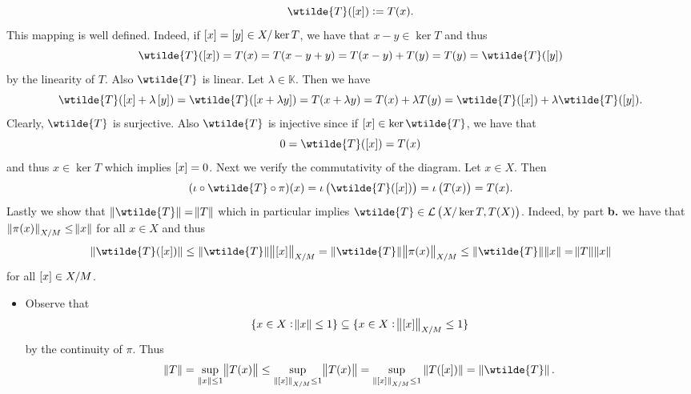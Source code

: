 \begin{enumerate}[label = \textbf{Exercise \arabic*.},wide = 0pt, itemsep = 1.5ex]
\begin{enumerate}[label = \textbf{\alph*.},wide = 0pt, itemsep = 1.5ex]
				\begin{equation*}
					\wtilde{T}(\sbr{x}) := T(x).
				\end{equation*}
				This mapping is well defined. Indeed, if $\sbr{x} = \sbr[0]{y} \in X/\ker T$, we have that $x - y \in \ker T$ and thus
				\begin{equation*}
					\wtilde{T}(\sbr{x}) = T(x) = T(x - y + y) = T(x - y) + T(y) = T(y) = \wtilde{T}(\sbr[0]{y})
				\end{equation*}
				\noindent by the linearity of $T$. Also $\wtilde{T}$ is linear. Let $\lambda \in \mathbb{K}$. Then we have
				\begin{equation*}
					\wtilde{T}(\sbr{x} + \lambda \sbr[0]{y}) = \wtilde{T}(\sbr[0]{x + \lambda y}) = T(x + \lambda y) = T(x) + \lambda T(y) = \wtilde{T}(\sbr{x}) + \lambda \wtilde{T}(\sbr[0]{y}).
				\end{equation*}
				Clearly, $\wtilde{T}$ is surjective. Also $\wtilde{T}$ is injective since if $\sbr{x} \in \ker \wtilde{T}$, we have that 
				\begin{equation*}
					0 = \wtilde{T}(\sbr{x}) = T(x)
				\end{equation*}
				\noindent and thus $x \in \ker T$ which implies $\sbr{x} = 0$. Next we verify the commutativity of the diagram. Let $x \in X$. Then
				\begin{equation*}
					(\iota \circ \wtilde{T} \circ \pi)(x) = \iota\del[1]{\wtilde{T}(\sbr{x})} = \iota\del[1]{T(x)} = T(x).
				\end{equation*}
				Lastly we show that $\norm[0]{\wtilde{T}} = \norm{T}$ which in particular implies $\wtilde{T} \in \mathcal{L}\del[1]{X/\ker T,T(X)}$. Indeed, by part \textbf{b.} we have that $\norm[0]{\pi(x)}_{X/M} \leq \norm{x}$ for all $x \in X$ and thus
				\begin{equation*}
					\norm[0]{\wtilde{T}(\sbr{x})} \leq \norm[0]{\wtilde{T}}\norm{\sbr{x}}_{X/M} = \norm[0]{\wtilde{T}}\norm{\pi(x)}_{X/M} \leq \norm[0]{\wtilde{T}}\norm{x} = \norm{T}\norm{x}
				\end{equation*}
				\noindent for all $\sbr{x} \in X/M$.
				\begin{itemize}[leftmargin = *]
					\item {} Observe that
						\begin{equation*}
							\cbr[0]{x \in X : \norm{x} \leq 1} \subseteq \cbr[0]{x \in X : \norm{\sbr{x}}_{X/M} \leq 1}
						\end{equation*}
						\noindent by the continuity of $\pi$. Thus
						\begin{equation*}
							\norm{T} = \sup_{\norm[0]{x} \leq 1} \norm{T(x)} \leq \sup_{\norm[0]{\sbr[0]{x}}_{X/M} \leq 1} \norm{T(x)} = \sup_{\norm[0]{\sbr[0]{x}}_{X/M} \leq 1} \norm[0]{T(\sbr{x})} = \norm[0]{\wtilde{T}}.
						\end{equation*}
				\end{itemize}
	
		\end{enumerate}
\end{enumerate}
\printbibliography

